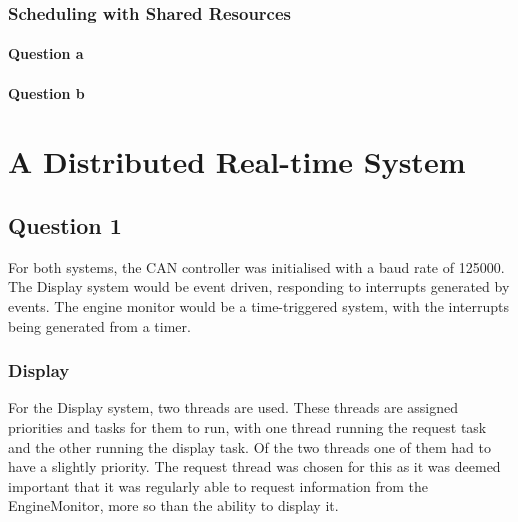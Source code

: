 \documentclass[]{report}
\begin{document}
		
		\subsection{Scheduling with Shared Resources}
			\subsubsection{Question a}
		


			\subsubsection{Question b}
	
	\chapter{A Distributed Real-time System}
		\section{Question 1}
		For both systems, the CAN controller was initialised with a baud rate of 125000. The Display system would be event driven, responding to interrupts generated by events. The engine monitor would be a time-triggered system, with the interrupts being generated from a timer.
			
			\subsection{Display}
			For the Display system, two threads are used. These threads are assigned priorities and tasks for them to run, with one thread running the request task and the other running the display task. Of the two threads one of them had to have a slightly priority. The request thread was chosen for this as it was deemed important that it was regularly able to request information from the EngineMonitor, more so than the ability to display it. 
			
\end{document}
